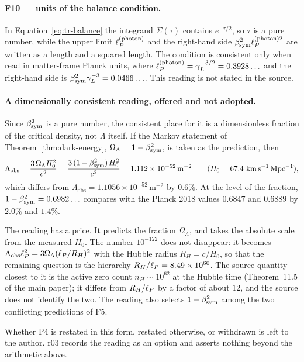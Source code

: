 \paragraph{F10 --- units of the balance condition.}
In Equation~\eqref{eq:tr-balance} the integrand \(\Sigma(\tau)\) contains \(e^{-\tau/2}\), so
\(\tau\) is a pure number, while the upper limit \(\ell_P^{(\mathrm{photon})}\) and the right-hand
side \(\beta_{\mathrm{sym}}^2\ell_P^{(\mathrm{photon})2}\) are written as a length and a squared length.  The
condition is consistent only when read in matter-frame Planck units, where
\(\ell_P^{(\mathrm{photon})}=\gamma_L^{-3/2}=0.3928\ldots\) and the right-hand side is
\(\beta_{\mathrm{sym}}^2\gamma_L^{-3}=0.0466\ldots\).  This reading is not stated in the source.

\paragraph{A dimensionally consistent reading, offered and not adopted.}
Since \(\beta_{\mathrm{sym}}^2\) is a pure number, the consistent place for it is a dimensionless fraction of
the critical density, not \(\Lambda\) itself.  If the Markov statement of
Theorem~\ref{thm:dark-energy}, \(\Omega_\Lambda=1-\beta_{\mathrm{sym}}^2\), is taken as the prediction, then
\[
\Lambda_{\mathrm{obs}}=\frac{3\,\Omega_\Lambda H_0^2}{c^2}
=\frac{3\,(1-\beta_{\mathrm{sym}}^2)\,H_0^2}{c^2}
=1.112\times10^{-52}\,\mathrm{m}^{-2}
\qquad(H_0=67.4\ \mathrm{km\,s^{-1}\,Mpc^{-1}}),
\]
which differs from \(\Lambda_{\mathrm{obs}}=1.1056\times10^{-52}\,\mathrm{m}^{-2}\) by \(0.6\%\).
At the level of the fraction, \(1-\beta_{\mathrm{sym}}^2=0.6982\ldots\) compares with the Planck 2018 values
\(0.6847\) and \(0.6889\) by \(2.0\%\) and \(1.4\%\).

The reading has a price.  It predicts the fraction \(\Omega_\Lambda\), and takes the absolute scale
from the measured \(H_0\).  The number \(10^{-122}\) does not disappear: it becomes
\(\Lambda_{\mathrm{obs}}\ell_P^2=3\Omega_\Lambda(\ell_P/R_H)^2\) with the Hubble radius \(R_H=c/H_0\), so
that the remaining question is the hierarchy \(R_H/\ell_P=8.49\times10^{60}\).  The source
quantity closest to it is the active zero count \(n_H\sim10^{62}\) at the Hubble time
(Theorem~11.5 of the main paper); it differs from \(R_H/\ell_P\) by a factor of about \(12\), and the
source does not identify the two.  The reading also selects \(1-\beta_{\mathrm{sym}}^2\) among the two
conflicting predictions of F5.

Whether P4 is restated in this form, restated otherwise, or withdrawn is left to the author.
r03 records the reading as an option and asserts nothing beyond the arithmetic above.

